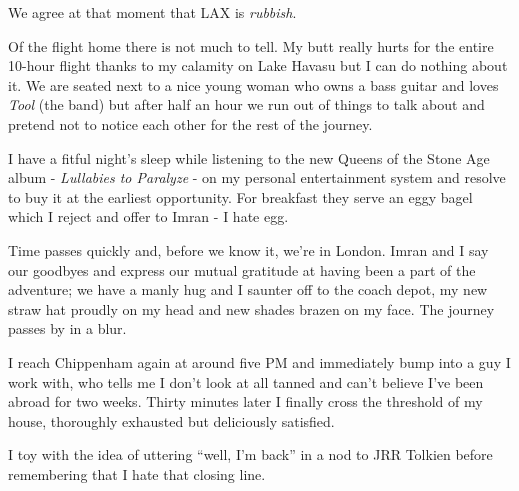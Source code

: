\documentclass[a5paper,titlepage,11pt]{book}
\begin{document}
We agree at that moment that LAX is \emph{rubbish}.

Of the flight home there is not much to tell.  My butt really hurts for the entire 10-hour flight thanks to my calamity on Lake Havasu but I can do nothing about it.  We are seated next to a nice young woman who owns a bass guitar and loves \emph{Tool} (the band) but after half an hour we run out of things to talk about and pretend not to notice each other for the rest of the journey.

I have a fitful night's sleep while listening to the new Queens of the Stone Age album - \emph{Lullabies to Paralyze} - on my personal entertainment system and resolve to buy it at the earliest opportunity.  For breakfast they serve an eggy bagel which I reject and offer to Imran - I hate egg.

Time passes quickly and, before we know it, we're in London.  Imran and I say our goodbyes and express our mutual gratitude at having been a part of the adventure; we have a manly hug and I saunter off to the coach depot, my new straw hat proudly on my head and new shades brazen on my face.  The journey passes by in a blur.

I reach Chippenham again at around five PM and immediately bump into a guy I work with, who tells me I don't look at all tanned and can't believe I've been abroad for two weeks.  Thirty minutes later I finally cross the threshold of my house, thoroughly exhausted but deliciously satisfied.

I toy with the idea of uttering ``well, I'm back'' in a nod to JRR Tolkien before remembering that I hate that closing line.
\end{document}
